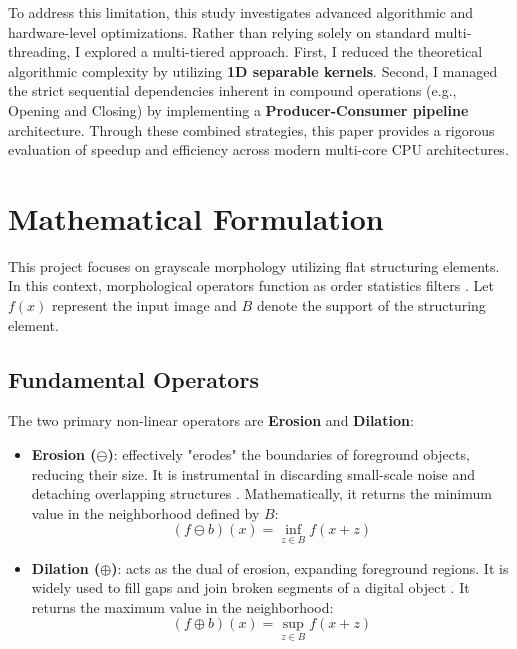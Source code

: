 \documentclass[10pt,twocolumn,letterpaper]{article}
\begin{document}
To address this limitation, this study investigates advanced algorithmic and hardware-level optimizations. Rather than relying solely on standard multi-threading, I explored a multi-tiered approach. First, I reduced the theoretical algorithmic complexity by utilizing \textbf{1D separable kernels}. Second, I managed the strict sequential dependencies inherent in compound operations (e.g., Opening and Closing) by implementing a \textbf{Producer-Consumer pipeline} architecture. Through these combined strategies, this paper provides a rigorous evaluation of speedup and efficiency across modern multi-core CPU architectures.

\section{Mathematical Formulation}
This project focuses on grayscale morphology utilizing flat structuring elements. In this context, morphological operators function as order statistics filters \cite{wikipedia_mm, ismail_paper}. Let $f(x)$ represent the input image and $B$ denote the support of the structuring element.

\subsection{Fundamental Operators}
The two primary non-linear operators are \textbf{Erosion} and \textbf{Dilation}:

\begin{itemize}
    \item \textbf{Erosion ($\ominus$)}: effectively "erodes" the boundaries of foreground objects, reducing their size. It is instrumental in discarding small-scale noise and detaching overlapping structures \cite{opencv_morph, ismail_paper}. Mathematically, it returns the minimum value in the neighborhood defined by $B$:
    \begin{equation}
    (f \ominus b)(x) = \inf_{z \in B} f(x+z)
    \end{equation}
    
    \item \textbf{Dilation ($\oplus$)}: acts as the dual of erosion, expanding foreground regions. It is widely used to fill gaps and join broken segments of a digital object \cite{opencv_morph, ismail_paper}. It returns the maximum value in the neighborhood:
    \begin{equation}
    (f \oplus b)(x) = \sup_{z \in B} f(x+z)
    \end{equation}
\end{itemize}
\end{document}
